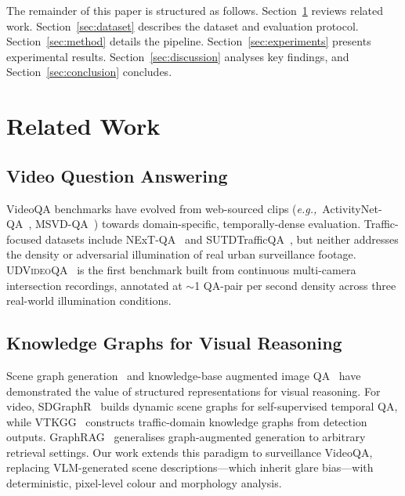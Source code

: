 \documentclass[10pt,conference,compsoc]{IEEEtran}
\newcommand{\dataset}{\textsc{UDVideoQA}}
\newcommand{\eg}{\textit{e.g.,}~}
\begin{document}
The remainder of this paper is structured as follows.
Section~\ref{sec:related} reviews related work.
Section~\ref{sec:dataset} describes the dataset and evaluation
protocol.
Section~\ref{sec:method} details the pipeline.
Section~\ref{sec:experiments} presents experimental results.
Section~\ref{sec:discussion} analyses key findings, and
Section~\ref{sec:conclusion} concludes.


\section{Related Work}
\label{sec:related}

\subsection{Video Question Answering}

VideoQA benchmarks have evolved from web-sourced clips
(\eg ActivityNet-QA~\cite{yu2019activitynet},
MSVD-QA~\cite{xu2017video}) towards domain-specific,
temporally-dense evaluation.
Traffic-focused datasets include NExT-QA~\cite{xiao2021nextqa}
and SUTDTrafficQA~\cite{xu2021sutd}, but neither addresses
the density or adversarial illumination of real urban
surveillance footage.
\dataset{}~\cite{udvideoqa2026} is the first benchmark built
from continuous multi-camera intersection recordings,
annotated at $\sim$1 QA-pair per second density across
three real-world illumination conditions.

\subsection{Knowledge Graphs for Visual Reasoning}

Scene graph generation~\cite{xu2017scenegraph} and knowledge-base
augmented image QA~\cite{marino2019ok} have demonstrated the
value of structured representations for visual reasoning.
For video, SDGraphR~\cite{sdgraphr2022} builds dynamic scene
graphs for self-supervised temporal QA, while
VTKGG~\cite{vtkgg2023} constructs traffic-domain knowledge graphs
from detection outputs.
GraphRAG~\cite{edge2024graphrag} generalises graph-augmented
generation to arbitrary retrieval settings.
Our work extends this paradigm to surveillance VideoQA, replacing
VLM-generated scene descriptions---which inherit glare bias---with
deterministic, pixel-level colour and morphology analysis.
\end{document}
